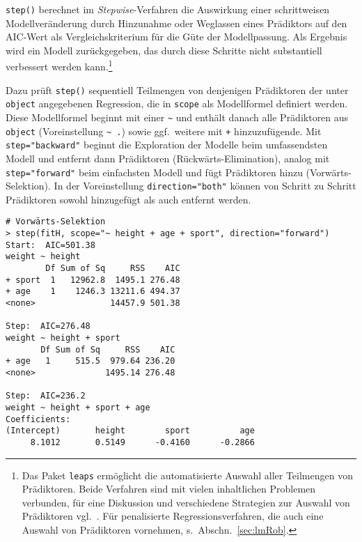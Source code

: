 \lstinline!step()! berechnet im \emph{Stepwise}-Verfahren die Auswirkung einer schrittweisen Modellveränderung durch Hinzunahme oder Weglassen eines Prädiktors auf den AIC-Wert als Vergleichskriterium für die Güte der Modellpassung. Als Ergebnis wird ein Modell zurückgegeben, das durch diese Schritte nicht substantiell verbessert werden kann.\footnote{Das Paket \lstinline!leaps! \cite{Lumley2009} ermöglicht die automatisierte Auswahl aller Teilmengen von Prädiktoren. Beide Verfahren sind mit vielen inhaltlichen Problemen verbunden, für eine Diskussion und verschiedene Strategien zur Auswahl von Prädiktoren vgl.\ . Für penalisierte Regressionsverfahren, die auch eine Auswahl von Prädiktoren vornehmen, s.\ Abschn.\ \ref{sec:lmRob}.}

Dazu prüft \lstinline!step()! sequentiell Teilmengen von denjenigen Prädiktoren der unter \lstinline!object! angegebenen Regression, die in \lstinline!scope! als Modellformel definiert werden. Diese Modellformel beginnt mit einer \lstinline!~! und enthält danach alle Prädiktoren aus \lstinline!object! (Voreinstellung \lstinline!~ .!) sowie ggf.\ weitere mit \lstinline!+! hinzuzufügende. Mit \lstinline!step="backward"! beginnt die Exploration der Modelle beim umfassendsten Modell und entfernt dann Prädiktoren (Rückwärts-Elimination), analog mit \lstinline!step="forward"! beim einfachsten Modell und fügt Prädiktoren hinzu (Vorwärts-Selektion). In der Voreinstellung \lstinline!direction="both"! können von Schritt zu Schritt Prädiktoren sowohl hinzugefügt als auch entfernt werden.
\begin{lstlisting}
# Vorwärts-Selektion
> step(fitH, scope="~ height + age + sport", direction="forward")
Start:  AIC=501.38
weight ~ height
        Df Sum of Sq     RSS    AIC
+ sport  1   12962.8  1495.1 276.48
+ age    1    1246.3 13211.6 494.37
<none>               14457.9 501.38

Step:  AIC=276.48
weight ~ height + sport
       Df Sum of Sq     RSS    AIC
+ age   1     515.5  979.64 236.20
<none>              1495.14 276.48

Step:  AIC=236.2
weight ~ height + sport + age
Coefficients:
(Intercept)       height        sport          age  
     8.1012       0.5149      -0.4160      -0.2866 
\end{lstlisting}


